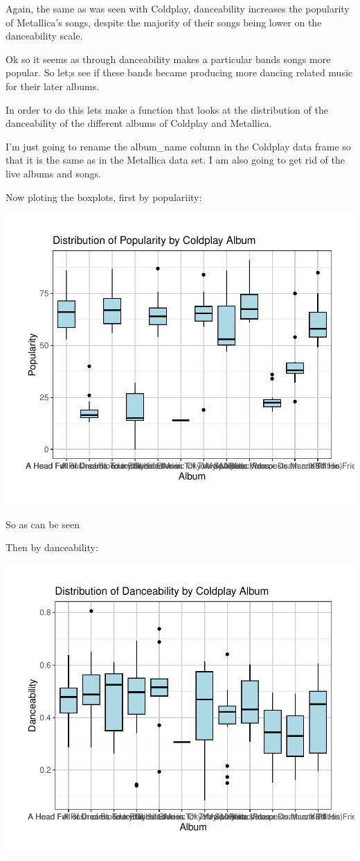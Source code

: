 \documentclass[11pt,preprint, authoryear]{elsarticle}
\numberwithin{equation}{section}
\numberwithin{figure}{section}
\numberwithin{table}{section}
\begin{document}
Again, the same as was seen with Coldplay, danceability increases the
popularity of Metallica's songs, despite the majority of their songs
being lower on the danceability scale.

Ok so it seems as through danceability makes a particular bands songs
more popular. So let;s see if these bands became producing more dancing
related music for their later albums.

In order to do this lets make a function that looks at the distribution
of the danceability of the different albums of Coldplay and Metallica.

I'm just going to rename the album\_name column in the Coldplay data
frame so that it is the same as in the Metallica data set. I am also
going to get rid of the live albums and songs.

Now ploting the boxplots, first by populariity:

\includegraphics{Question_3_files/figure-latex/unnamed-chunk-7-1.pdf}

So as can be seen

Then by danceability:

\includegraphics{Question_3_files/figure-latex/unnamed-chunk-8-1.pdf}
\end{document}
